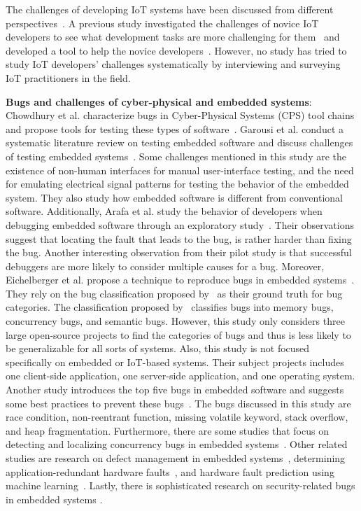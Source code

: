 The challenges of developing IoT systems have been discussed from different perspectives~\cite{stojkoska2017review,vcolakovic2018IoT,hnat2011hitchhiker}. A previous study investigated the challenges of novice IoT developers to see what development tasks are more challenging for them~\cite{corno2019challenges} and developed a tool to help the novice developers~\cite{corno2019towards}. However, no study has tried to study IoT developers' challenges systematically by interviewing and surveying IoT practitioners in the field.


\textbf{Bugs and challenges of cyber-physical and embedded systems}: Chowdhury et al. characterize bugs in Cyber-Physical Systems (CPS) tool chains and propose tools for testing these types of software~\cite{chowdhury2016cyfuzz,chowdhury2018automatically}. Garousi et al. conduct a systematic literature review on testing embedded software and discuss challenges of testing embedded systems~\cite{garousi2018testing}. Some challenges mentioned in this study are the existence of non-human interfaces for manual user-interface testing, and the need for emulating electrical signal patterns for testing the behavior of the embedded system. They also study how embedded software is different from conventional software. Additionally, Arafa et al. study the behavior of developers when debugging embedded software through an exploratory study~\cite{arafa2017debugging}. Their observations suggest that locating the fault that leads to the bug, is rather harder than fixing the bug. Another interesting observation from their pilot study is that successful debuggers are more likely to consider multiple causes for a bug. Moreover, Eichelberger et al. propose a technique to reproduce bugs in embedded systems~\cite{eichelberger2017automated}. They rely on the bug classification proposed by~\cite{bugCharOpenSoftware} as their ground truth for bug categories. The classification proposed by~\cite{bugCharOpenSoftware} classifies bugs into memory bugs, concurrency bugs, and semantic bugs. However, this study only considers three large open-source projects to find the categories of bugs and thus is less likely to be generalizable for all sorts of systems. Also, this study is not focused specifically on embedded or IoT-based systems. Their subject projects includes one client-side application, one server-side application, and one operating system. Another study introduces the top five bugs in embedded software and suggests some best practices to prevent these bugs~\cite{barr2010five}. The bugs discussed in this study are race condition, non-reentrant function, missing volatile keyword, stack overflow, and heap fragmentation. Furthermore, there are some studies that focus on detecting and localizing concurrency bugs in embedded systems~\cite{asadollah2018runtime,johansson2019concurrency}. Other related studies are research on defect management in embedded systems~\cite{la2017defects}, determining application-redundant hardware faults~\cite{bartsch2017hw}, and hardware fault prediction using machine learning~\cite{khalil2020machine}. Lastly, there is sophisticated research on security-related bugs in embedded systems \cite{yuce2018fault,dessouky2019hardfails,dessouky2018patch}.

